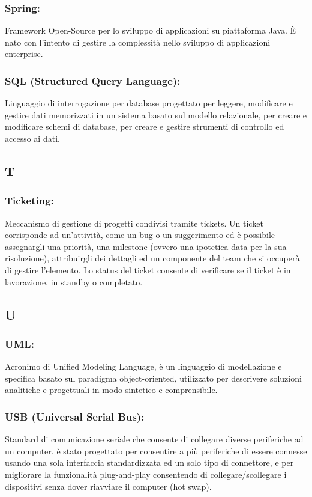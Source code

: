 \subsubsection*{Spring:} Framework Open-Source per lo sviluppo di applicazioni
su piattaforma Java. \`E nato con l'intento di gestire la complessit\`a nello
sviluppo di applicazioni enterprise.

\subsubsection*{SQL (Structured Query Language):} Linguaggio di
interrogazione per database progettato per leggere, modificare e gestire dati
memorizzati in un sistema basato sul modello relazionale, per creare e
modificare schemi di database, per creare e gestire strumenti di controllo ed
accesso ai dati.

\subsection*{\huge{T}}
\subsubsection*{Ticketing:} Meccanismo di gestione di progetti condivisi tramite
tickets. Un ticket corrisponde ad un'attivit\`a, come un bug o un suggerimento
ed \`e possibile assegnargli una priorit\`a, una milestone (ovvero una ipotetica
data per la sua risoluzione), attribuirgli dei dettagli ed un componente del
team che si occuper\`a di gestire l'elemento. Lo status del ticket consente di
verificare se il ticket \`e in lavorazione, in standby o completato.

\subsection*{\huge{U}}

\subsubsection*{UML:} Acronimo di Unified Modeling Language, \`e un linguaggio
di modellazione e specifica basato sul paradigma object-oriented, utilizzato per
descrivere soluzioni analitiche e progettuali in modo sintetico e comprensibile.

\subsubsection*{USB (Universal Serial Bus):} Standard di comunicazione seriale
che consente di collegare diverse periferiche ad un computer. \`e stato progettato
per consentire a pi\`u periferiche di essere connesse usando una sola interfaccia
standardizzata ed un solo tipo di connettore, e per migliorare la funzionalit\`a
plug-and-play consentendo di collegare/scollegare i dispositivi senza dover
riavviare il computer (hot swap).

